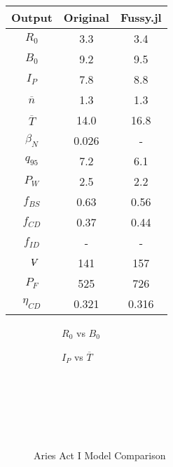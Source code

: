 \begin{table}[h!]
\begin{subtable}[t]{0.5\textwidth}
\begin{tabular}{ c|c|c }
Output           & Original         & Fussy.jl        \\
\hline
$R_{0}$          & 3.3              & 3.4           \\
$B_{0}$          & 9.2              & 9.5           \\
$I_{P}$          & 7.8              & 8.8           \\
$\overline n$    & 1.3              & 1.3           \\
$\overline T$    & 14.0             & 16.8           \\
$\beta_{N}$       & 0.026           & -          \\
$q_{95}$         & 7.2              & 6.1           \\
$P_{W}$          & 2.5              & 2.2           \\
$f_{BS}$         & 0.63             & 0.56          \\
$f_{CD}$         & 0.37             & 0.44          \\
$f_{ID}$         & -              & -             \\
$\volume$         & 141            & 157           \\
$P_{F}$          & 525            & 726           \\
$\eta_{CD}$      & 0.321            & 0.316          \\

\end{tabular}
\end{subtable}
\hfill
\hfill
\label{table:arc}
\end{table}

\begin{figure*}[h!]
    \centering
    \hfill 
    \begin{subfigure}[t]{0.45\textwidth}
        \centering
    \begin{adjustbox}{width=\textwidth}
      \Large
      
    \end{adjustbox}
        \caption{$R_0$ vs $B_0$}
    \end{subfigure}
    \hfill
    \begin{subfigure}[t]{0.45\textwidth}
        \centering
    \begin{adjustbox}{width=\textwidth}
      \Large
      
    \end{adjustbox}
        \caption{$I_P$ vs $\overline T$}
    \end{subfigure}
    \hfill \hfill ~\\ ~\\ ~\\
    \caption{Aries Act I Model Comparison} ~\\
    \label{fig:act_1_comparison}
\end{figure*}

